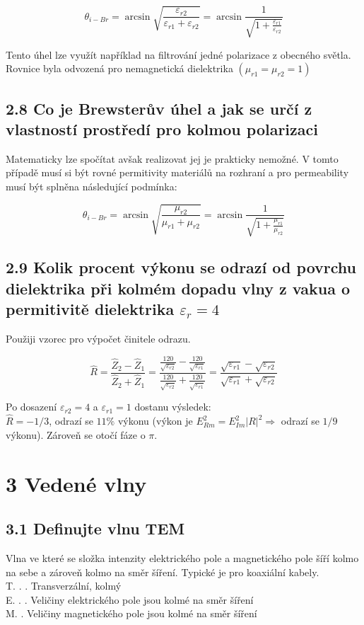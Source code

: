 \documentclass[10pt]{article}
\begin{document}
$$
\theta_{i-B r}=\arcsin \sqrt{\frac{\varepsilon_{r 2}}{\varepsilon_{r 1}+\varepsilon_{r 2}}}=\arcsin \frac{1}{\sqrt{1+\frac{\varepsilon_{r 1}}{\varepsilon_{r 2}}}}
$$

Tento úhel lze využít například na filtrování jedné polarizace z obecného světla. Rovnice byla odvozená pro nemagnetická dielektrika $\left(\mu_{r 1}=\mu_{r 2}=1\right)$

\subsection*{2.8 Co je Brewsterův úhel a jak se určí z vlastností prostředí pro kolmou polarizaci}
Matematicky lze spočítat avšak realizovat jej je prakticky nemožné. V tomto případě musí si být rovné permitivity materiálů na rozhraní a pro permeability musí být splněna následující podmínka:

$$
\theta_{i-B r}=\arcsin \sqrt{\frac{\mu_{r 2}}{\mu_{r 1}+\mu_{r 2}}}=\arcsin \frac{1}{\sqrt{1+\frac{\mu_{r 1}}{\mu_{r 2}}}}
$$

\subsection*{2.9 Kolik procent výkonu se odrazí od povrchu dielektrika při kolmém dopadu vlny z vakua o permitivitě dielektrika $\varepsilon_{r}=4$}
Použiji vzorec pro výpočet činitele odrazu.

$$
\hat{R}=\frac{\hat{Z}_{2}-\hat{Z}_{1}}{\hat{Z}_{2}+\hat{Z}_{1}}=\frac{\frac{120}{\sqrt{\varepsilon_{r 2}}}-\frac{120}{\sqrt{\varepsilon_{r 1}}}}{\frac{120}{\sqrt{\varepsilon_{r 2}}}+\frac{120}{\sqrt{\varepsilon_{r 1}}}}=\frac{\sqrt{\varepsilon_{r 1}}-\sqrt{\varepsilon_{r 2}}}{\sqrt{\varepsilon_{r 1}}+\sqrt{\varepsilon_{r 2}}}
$$

Po dosazení $\varepsilon_{r 2}=4$ a $\varepsilon_{r 1}=1$ dostanu výsledek:\\
$\hat{R}=-1 / 3$, odrazí se $11 \%$ výkonu (výkon je $E_{R m}^{2}=E_{I m}^{2}|R|^{2} \Rightarrow$ odrazí se $1 / 9$ výkonu). Zároveň se otočí fáze o $\pi$.

\section*{3 Vedené vlny}
\subsection*{3.1 Definujte vlnu TEM}
Vlna ve které se složka intenzity elektrického pole a magnetického pole šíří kolmo na sebe a zároveň kolmo na směr šíření. Typické je pro koaxiální kabely.\\
T. . . Transverzální, kolmý\\
E. . . Veličiny elektrického pole jsou kolmé na směr šíření\\
M. . Veličiny magnetického pole jsou kolmé na směr šíření
\end{document}
